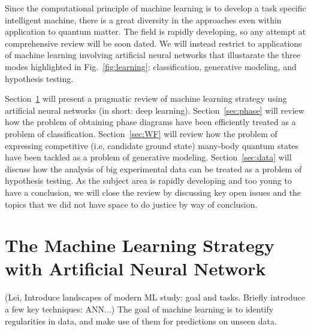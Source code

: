 \documentclass[aps,prb,floatfix,amsmath,amssymb,amsfonts,10pt,floatfix,longbibliography]{revtex4-1}
\begin{document}
Since the computational principle of machine learning is to develop a task specific intelligent machine, there is a great diversity in the approaches even within application to quantum matter.
The field is rapidly developing, so any attempt at comprehensive review will be soon dated. We will instead restrict to applications of machine learning involving artificial neural networks that illustarate the three modes highlighted in Fig.~\ref{fig:learning}: classification, generative modeling, and hypothesis testing.

Section~\ref{sec:ML} will present a pragmatic review of machine learning strategy using artificial neural networks (in short: deep learning).
Section~\ref{sec:phase} will review how the problem of obtaining phase diagrams have been efficiently treated as a problem of classification. Section~\ref{sec:WF} will review how the problem of expressing competitive (i.e, candidate ground state) many-body quantum states have been tackled as a problem of generative modeling. Section~\ref{sec:data} will discuss how the analysis of big experimental data can be treated as a problem of hypothesis testing. As the subject area is rapidly developing and too young to have a conclusion, we will close the review by discussing key open issues and the topics that we did not have space to do justice by way of conclusion. 

\section{The Machine Learning Strategy with Artificial Neural Network}
\label{sec:ML}

(Lei, Introduce landscapes of modern ML study: goal and tasks. Briefly introduce a few key techniques: ANN...)
The goal of machine learning is to identify regularities in data, and make use of them for predictions on unseen data. %
\end{document}
